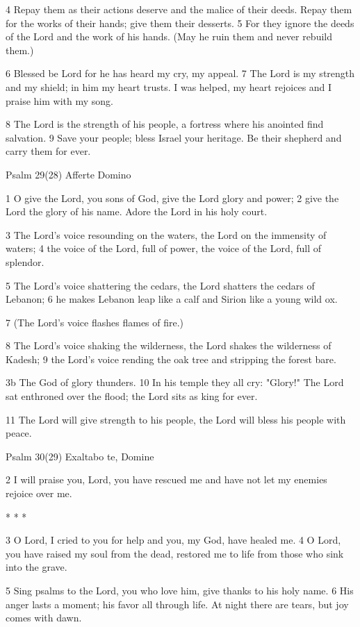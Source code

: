 4 Repay them as their actions deserve
and the malice of their deeds.
Repay them for the works of their hands;
give them their desserts.
5 For they ignore the deeds of the Lord
and the work of his hands.
(May he ruin them and never rebuild them.)

6 Blessed be Lord for he has heard
my cry, my appeal.
7 The Lord is my strength and my shield;
in him my heart trusts.
I was helped, my heart rejoices
and I praise him with my song.

8 The Lord is the strength of his people,
a fortress where his anointed find salvation.
9 Save your people; bless Israel your heritage.
Be their shepherd and carry them for ever.


Psalm 29(28) Afferte Domino

1 O give the Lord, you sons of God,
give the Lord glory and power;
2 give the Lord the glory of his name.
Adore the Lord in his holy court.

3 The Lord's voice resounding on the waters,
the Lord on the immensity of waters;
4 the voice of the Lord, full of power,
the voice of the Lord, full of splendor.

5 The Lord's voice shattering the cedars,
the Lord shatters the cedars of Lebanon;
6 he makes Lebanon leap like a calf
and Sirion like a young wild ox.

7 (The Lord's voice flashes flames of fire.)

8 The Lord's voice shaking the wilderness,
the Lord shakes the wilderness of Kadesh;
9 the Lord's voice rending the oak tree
and stripping the forest bare.

3b The God of glory thunders.
10 In his temple they all cry: "Glory!"
The Lord sat enthroned over the flood;
the Lord sits as king for ever.

11 The Lord will give strength to his people,
the Lord will bless his people with peace.



Psalm 30(29) Exaltabo te, Domine

2 I will praise you, Lord, you have rescued me
and have not let my enemies rejoice over me.

* * *

3 O Lord, I cried to you for help
and you, my God, have healed me.
4 O Lord, you have raised my soul from the dead,
restored me to life from those who sink into the grave.

5 Sing psalms to the Lord, you who love him,
give thanks to his holy name.
6 His anger lasts a moment; his favor all through life.
At night there are tears, but joy comes with dawn.


